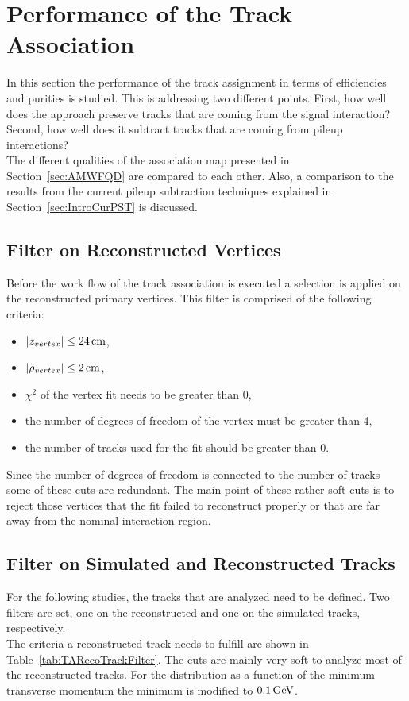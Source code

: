\chapter{Performance of the Track Association \label{sec:TrackAss} }

In this section the performance of the track assignment in terms of efficiencies and purities is studied. This is addressing two different points. First, how well does the approach preserve tracks that are coming from the signal interaction? Second, how well does it subtract tracks that are coming from pileup interactions?\\
The different qualities of the association map presented in Section~\ref{sec:AMWFQD} are compared to each other. Also, a comparison to the results from the current pileup subtraction techniques explained in Section~\ref{sec:IntroCurPST} is discussed.

\section{Filter on Reconstructed Vertices \label{sec:TAFVC}}

Before the work flow of the track association is executed a selection is applied on the reconstructed primary vertices. This filter is comprised of the following criteria:
\begin{itemize}
    \item $ \left| z_{vertex} \right| \leq 24\,\text{cm}$,
    \item $ \left| \rho_{vertex} \right| \leq 2\,\text{cm}$,
    \item $\chi^{2}$ of the vertex fit needs to be greater than 0,
    \item the number of degrees of freedom of the vertex must be greater than 4,
    \item the number of tracks used for the fit should be greater than 0.
\end{itemize}
Since the number of degrees of freedom is connected to the number of tracks some of these cuts are redundant. The main point of these rather soft cuts is to reject those vertices that the fit failed to reconstruct properly or that are far away from the nominal interaction region.

\section{Filter on Simulated and Reconstructed Tracks \label{sec:TAFSRT}}

For the following studies, the tracks that are analyzed need to be defined. Two filters are set, one on the reconstructed and one on the simulated tracks, respectively. \\
The criteria a reconstructed track needs to fulfill are shown in Table~\ref{tab:TARecoTrackFilter}. The cuts are mainly very soft to analyze most of the reconstructed tracks. For the distribution as a function of the minimum transverse momentum the minimum \pt{} is modified to $0.1\,\text{Ge\hspace{-.08em}V}$.

